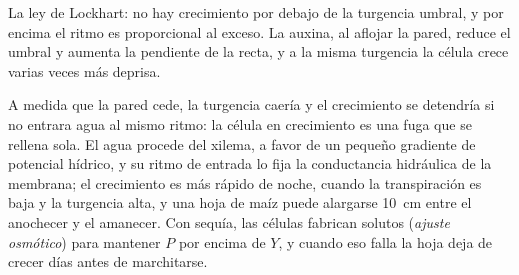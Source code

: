 \begin{omfigure}

{\small La ley de Lockhart: no hay crecimiento por debajo de la turgencia
umbral, y por encima el ritmo es proporcional al exceso. La auxina, al
aflojar la pared, reduce el umbral y aumenta la pendiente de la recta, y a
la misma turgencia la célula crece varias veces más deprisa.}
\end{omfigure}

\begin{example}\label{ex:b2:plant-meristems:water}
A medida que la pared cede, la turgencia caería y el crecimiento se
detendría si no entrara agua al mismo ritmo: la célula en crecimiento es
una fuga que se rellena sola. El agua procede del xilema, a favor de un
pequeño gradiente de potencial hídrico, y su ritmo de entrada lo fija la
conductancia hidráulica de la membrana; el crecimiento es más rápido de
noche, cuando la transpiración es baja y la turgencia alta, y una hoja de
maíz puede alargarse \qty{10}{cm} entre el anochecer y el amanecer. Con
sequía, las células fabrican solutos (\emph{ajuste osmótico}) para
mantener $P$ por encima de $Y$, y cuando eso falla la hoja deja de crecer
días antes de marchitarse.
\end{example}

